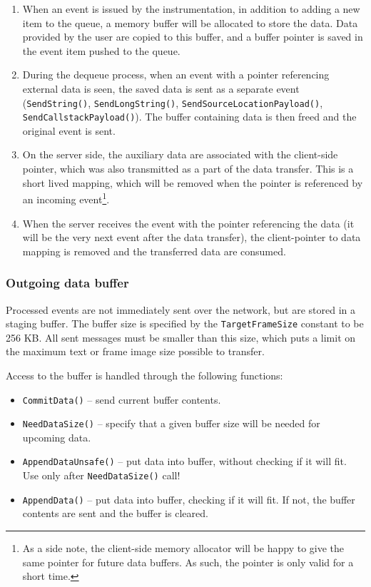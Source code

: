 \documentclass[hidelinks,titlepage,a4paper]{article}
\begin{document}
\begin{enumerate}
\item When an event is issued by the instrumentation, in addition to adding a new item to the queue, a memory buffer will be allocated to store the data. Data provided by the user are copied to this buffer, and a buffer pointer is saved in the event item pushed to the queue.
\item During the dequeue process, when an event with a pointer referencing external data is seen, the saved data is sent as a separate event (\texttt{SendString()}, \texttt{SendLongString()}, \texttt{SendSourceLocationPayload()}, \texttt{SendCallstackPayload()}). The buffer containing data is then freed and the original event is sent.
\item On the server side, the auxiliary data are associated with the client-side pointer, which was also transmitted as a part of the data transfer. This is a short lived mapping, which will be removed when the pointer is referenced by an incoming event\footnote{As a side note, the client-side memory allocator will be happy to give the same pointer for future data buffers. As such, the pointer is only valid for a short time.}.
\item When the server receives the event with the pointer referencing the data (it will be the very next event after the data transfer), the client-pointer to data mapping is removed and the transferred data are consumed.
\end{enumerate}

\subsubsection{Outgoing data buffer}

Processed events are not immediately sent over the network, but are stored in a staging buffer. The buffer size is specified by the \texttt{TargetFrameSize} constant to be 256 KB. All sent messages must be smaller than this size, which puts a limit on the maximum text or frame image size possible to transfer.

Access to the buffer is handled through the following functions:

\begin{itemize}
\item \texttt{CommitData()} -- send current buffer contents.
\item \texttt{NeedDataSize()} -- specify that a given buffer size will be needed for upcoming data.
\item \texttt{AppendDataUnsafe()} -- put data into buffer, without checking if it will fit. Use only after \texttt{NeedDataSize()} call!
\item \texttt{AppendData()} -- put data into buffer, checking if it will fit. If not, the buffer contents are sent and the buffer is cleared.
\end{itemize}
\end{document}
